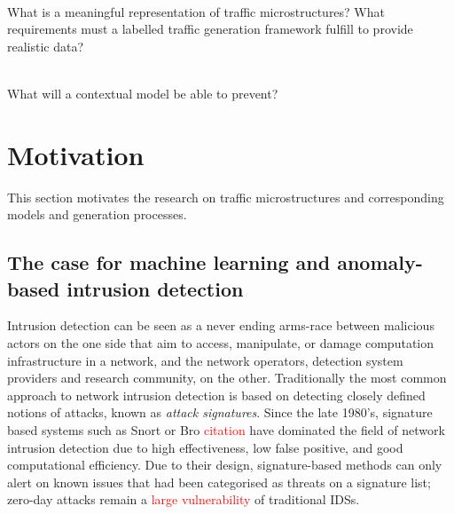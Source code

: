 \begin{rquestion}\ \\
What is a meaningful representation of traffic microstructures? What requirements must a labelled traffic generation framework fulfill to provide realistic data?
\end{rquestion}


\begin{rquestion}\ \\
What will a contextual model be able to prevent? 
\end{rquestion}



\section{Motivation}

This section motivates the research on traffic microstructures and corresponding models and generation processes.

\subsection{The case for machine learning and anomaly-based intrusion detection}

Intrusion detection can be seen as a never ending arms-race between malicious actors on the one side that aim to access, manipulate, or damage computation infrastructure in a network, and the network operators, detection system providers and research community, on  the other. Traditionally the most common approach to network intrusion detection is based on detecting closely defined notions of attacks, known as \emph{attack signatures}. Since the late 1980's, signature based systems such as Snort or Bro \textcolor{red}{citation} have dominated the field of network intrusion detection due to high effectiveness, low false positive, and good computational efficiency. Due to their design, signature-based methods can only alert on known issues that had been categorised as threats on a signature list; zero-day attacks remain a \textcolor{red}{large vulnerability} of traditional IDSs.

